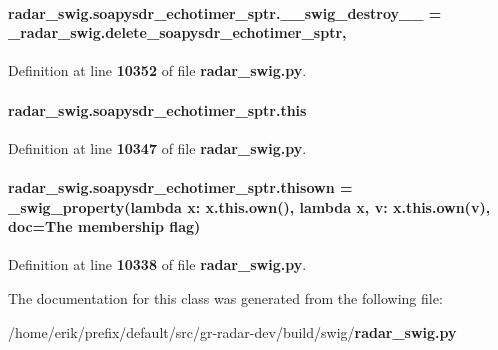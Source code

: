\paragraph[{\+\_\+\+\_\+swig\+\_\+destroy\+\_\+\+\_\+}]{\setlength{\rightskip}{0pt plus 5cm}radar\+\_\+swig.\+soapysdr\+\_\+echotimer\+\_\+sptr.\+\_\+\+\_\+swig\+\_\+destroy\+\_\+\+\_\+ = \+\_\+radar\+\_\+swig.\+delete\+\_\+soapysdr\+\_\+echotimer\+\_\+sptr\hspace{0.3cm}{\ttfamily [static]}, {\ttfamily [private]}}\label{classradar__swig_1_1soapysdr__echotimer__sptr_a13ce37267ed25fd37a1fe547846c1c0b}


Definition at line {\bf 10352} of file {\bf radar\+\_\+swig.\+py}.

\paragraph[{this}]{\setlength{\rightskip}{0pt plus 5cm}radar\+\_\+swig.\+soapysdr\+\_\+echotimer\+\_\+sptr.\+this}\label{classradar__swig_1_1soapysdr__echotimer__sptr_a564d145cc9d2232a7a56a7bc0481b36b}


Definition at line {\bf 10347} of file {\bf radar\+\_\+swig.\+py}.

\paragraph[{thisown}]{\setlength{\rightskip}{0pt plus 5cm}radar\+\_\+swig.\+soapysdr\+\_\+echotimer\+\_\+sptr.\+thisown = {\bf \+\_\+swig\+\_\+property}(lambda x\+: x.\+this.\+own(), lambda {\bf x}, v\+: x.\+this.\+own(v), doc=\textquotesingle{}The membership flag\textquotesingle{})\hspace{0.3cm}{\ttfamily [static]}}\label{classradar__swig_1_1soapysdr__echotimer__sptr_ac675f9800f2ad858f05ab2e644790782}


Definition at line {\bf 10338} of file {\bf radar\+\_\+swig.\+py}.



The documentation for this class was generated from the following file\+:\begin{DoxyCompactItemize}
\item 
/home/erik/prefix/default/src/gr-\/radar-\/dev/build/swig/{\bf radar\+\_\+swig.\+py}\end{DoxyCompactItemize}
